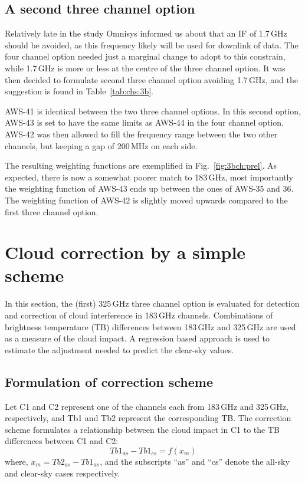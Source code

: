 \documentclass[12pt]{article}
\begin{document}
\subsection{A second three channel option}
%
Relatively late in the study Omnisys informed us about that an IF of 1.7\,GHz
should be avoided, as this frequency likely will be used for downlink of data.
The four channel option needed just a marginal change to adopt to this
constrain, while 1.7\,GHz is more or less at the centre of the three channel
option. It was then decided to formulate second three channel option avoiding 
1.7\,GHz, and the suggestion is found in Table~\ref{tab:chs:3b}.

AWS-41 is identical between the two three channel options. In this second
option, AWS-43 is set to have the same limits as AWS-44 in the four channel
option. AWS-42 was then allowed to fill the frequency range between the two
other channels, but keeping a gap of 200\,MHz on each side.

The resulting weighting functions are exemplified in Fig.~\ref{fig:3bch:prel}.
As expected, there is now a somewhat poorer match to 183\,GHz, most importantly
the weighting function of AWS-43 ends up between the ones of AWS-35 and 36. The
weighting function of AWS-42 is slightly moved upwards compared to the first
three channel option.



\section{Cloud correction by a simple scheme}
\label{sec:simple}
%
In this section, the (first) 325\,GHz three channel option is evaluated for detection
and correction of cloud interference in 183\,GHz channels. Combinations of
brightness temperature (TB) differences between 183\,GHz and 325\,GHz are used
as a measure of the cloud impact. A regression based approach is used to
estimate the adjustment needed to predict the clear-sky values.




\subsection{Formulation of correction scheme}
\label{sec:correction:scheme}
%
Let C1 and C2 represent one of the channels each from 183\,GHz and 325\,GHz,
respectively, and Tb1 and Tb2 represent the corresponding TB. The correction
scheme formulates a relationship between the cloud impact in C1 to the TB
differences between C1 and C2:
\begin{equation}
Tb1_{as}-Tb1_{cs} = f(x_m)
\label{eq:TB:diff}
\end{equation}
where, $x_m = Tb2_{as} - Tb1_{as}$, and the subscripts ``as'' and ``cs'' denote the all-sky and clear-sky cases respectively.  
\end{document}
